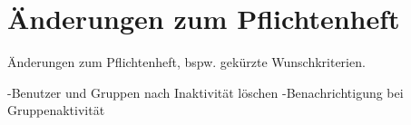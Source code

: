 \section{Änderungen zum Pflichtenheft}

Änderungen zum Pflichtenheft, bspw. gekürzte Wunschkriterien.

-Benutzer und Gruppen nach Inaktivität löschen
-Benachrichtigung bei Gruppenaktivität

